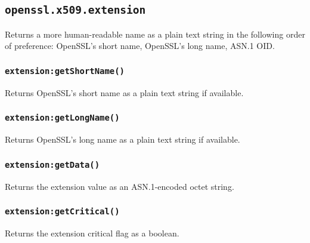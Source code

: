 \documentclass[11pt, oneside]{memoir}
\newcommand*{\fn}[1]{\texttt{#1}\xspace}
\newcounter{toccols}
\newenvironment{Module}[1]{
	\subsection{\texttt{#1}}
	\addtocontents{toc}{
		\protect\begin{multicols}{\value{toccols}}
	}
}{
	\addtocontents{toc}{\protect\end{multicols}}
}
\begin{document}
\begin{Module}{openssl.x509.extension}
Returns a more human-readable name as a plain text string in the following order of preference: OpenSSL's short name, OpenSSL's long name, ASN.1 OID.

\subsubsection[\fn{extension:getShortName}]{\fn{extension:getShortName()}}

Returns OpenSSL's short name as a plain text string if available.

\subsubsection[\fn{extension:getLongName}]{\fn{extension:getLongName()}}

Returns OpenSSL's long name as a plain text string if available.

\subsubsection[\fn{extension:getData}]{\fn{extension:getData()}}

Returns the extension value as an ASN.1-encoded octet string.

\subsubsection[\fn{extension:getCritical}]{\fn{extension:getCritical()}}

Returns the extension critical flag as a boolean.

\end{Module}
\end{document}
